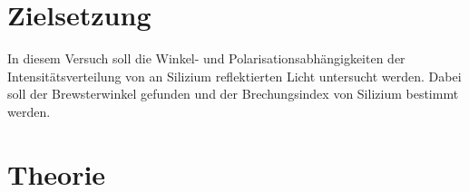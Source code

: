 \section{Zielsetzung}
In diesem Versuch soll die Winkel- und Polarisationsabhängigkeiten der Intensitätsverteilung
von an Silizium reflektierten Licht untersucht werden. Dabei soll der Brewsterwinkel gefunden und
der Brechungsindex von Silizium bestimmt werden.

\section{Theorie}
\label{sec:Theorie}

\cite{sample}
